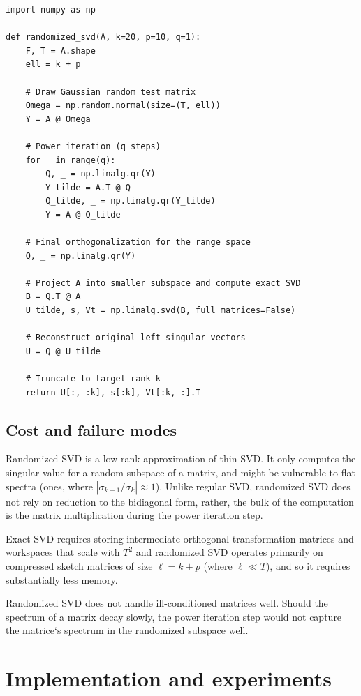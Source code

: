 \documentclass[11pt,a4paper]{article}
\theoremstyle{plain}
\theoremstyle{definition}
\theoremstyle{remark}
\begin{document}
\begin{lstlisting}[caption={Randomized SVD with $q=1$ power step in NumPy.},label={lst:rsvd}]
import numpy as np

def randomized_svd(A, k=20, p=10, q=1):
    F, T = A.shape
    ell = k + p

    # Draw Gaussian random test matrix
    Omega = np.random.normal(size=(T, ell))
    Y = A @ Omega

    # Power iteration (q steps)
    for _ in range(q):
        Q, _ = np.linalg.qr(Y)
        Y_tilde = A.T @ Q
        Q_tilde, _ = np.linalg.qr(Y_tilde)
        Y = A @ Q_tilde

    # Final orthogonalization for the range space
    Q, _ = np.linalg.qr(Y)

    # Project A into smaller subspace and compute exact SVD
    B = Q.T @ A
    U_tilde, s, Vt = np.linalg.svd(B, full_matrices=False)

    # Reconstruct original left singular vectors
    U = Q @ U_tilde

    # Truncate to target rank k
    return U[:, :k], s[:k], Vt[:k, :].T
\end{lstlisting}

\subsection{Cost and failure modes}

Randomized SVD is a low-rank approximation of thin SVD.
It only computes the singular value for a random subspace of a matrix,
and might be vulnerable to flat spectra (ones, where $|\sigma_{k+1}/\sigma_k| \approx 1$).
Unlike regular SVD, randomized SVD does not rely on reduction to the bidiagonal form,
rather, the bulk of the computation is the matrix multiplication during the power iteration step.

Exact SVD requires storing intermediate orthogonal transformation
matrices and workspaces that scale with $T^2$ and randomized SVD operates primarily on
compressed sketch matrices of size $\ell = k + p$ (where $\ell \ll T$), and so it requires substantially less memory.

Randomized SVD does not handle ill-conditioned matrices well.
Should the spectrum of a matrix decay slowly, the power iteration step
would not capture the matrice`s spectrum in the randomized subspace well.

\section{Implementation and experiments}
\label{sec:experiments}
\end{document}
